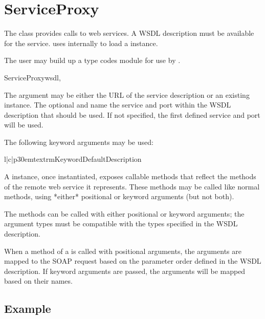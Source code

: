 \section{ServiceProxy}

The  class provides calls to
web services. A WSDL description must be available for the 
service.   uses  internally to load 
a  instance.

The user may build up a type codes module for use by .

\begin{classdesc}{ServiceProxy}{wsdl,}

The  argument may be either the URL of the service description 
or an existing  instance. The optional  and 
 name the service and port within the WSDL description that 
should be used. If not specified, the first defined service and port 
will be used.

The following keyword arguments may be used:

\begin{tableiii}{l|c|p{30em}}{textrm}{Keyword}{Default}{Description}
\end{tableiii}

A  instance, once instantiated, exposes callable 
methods that reflect the methods of the remote web service it 
represents. These methods may be called like normal methods, using 
*either* positional or keyword arguments (but not both).

The methods can be called with either positional or keyword arguments;
the argument types must be compatible with the types specified in the
WSDL description.

When a method of a  is called with positional 
arguments, the arguments are mapped to the SOAP request based on 
the parameter order defined in the WSDL description. If keyword 
arguments are passed, the arguments will be mapped based on their 
names.

\end{classdesc}

\subsection{Example}

